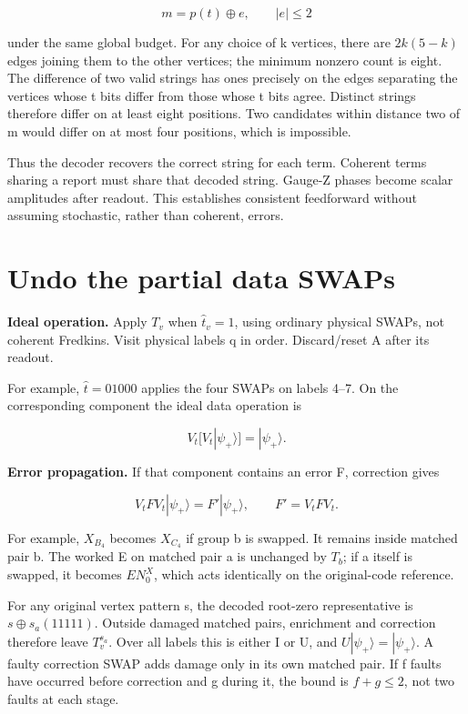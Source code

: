 \documentclass[11pt]{article}
\begin{document}
\[
m=p(t)\oplus e,\qquad |e|\le2
\]

under the same global budget. For any choice of k vertices, there are \(2k(5-k)\) edges joining them to the other vertices; the minimum nonzero count is eight. The difference of two valid strings has ones precisely on the edges separating the vertices whose t bits differ from those whose t bits agree. Distinct strings therefore differ on at least eight positions. Two candidates within distance two of m would differ on at most four positions, which is impossible.

Thus the decoder recovers the correct string for each term. Coherent terms sharing a report must share that decoded string. Gauge-Z phases become scalar amplitudes after readout. This establishes consistent feedforward without assuming stochastic, rather than coherent, errors.

\section{Undo the partial data SWAPs}
\textbf{Ideal operation.} Apply \(T_v\) when \(\widehat t_v=1\), using ordinary physical SWAPs, not coherent Fredkins. Visit physical labels q in order. Discard/reset A after its readout.

\begin{center}\begin{minipage}{\linewidth}

\end{minipage}\end{center}

For example, \(\widehat t=01000\) applies the four SWAPs on labels 4--7. On the corresponding component the ideal data operation is

\[
V_t\bigl[V_t|\psi_+\rangle\bigr]=|\psi_+\rangle.
\]

\textbf{Error propagation.} If that component contains an error F, correction gives

\[
V_t F V_t|\psi_+\rangle=F'|\psi_+\rangle,\qquad F'=V_t F V_t.
\]

For example, \(X_{B_4}\) becomes \(X_{C_4}\) if group b is swapped. It remains inside matched pair b. The worked E on matched pair a is unchanged by \(T_b\); if a itself is swapped, it becomes \(E N_0^X\), which acts identically on the original-code reference.

For any original vertex pattern s, the decoded root-zero representative is \(s\oplus s_a(11111)\). Outside damaged matched pairs, enrichment and correction therefore leave \(T_v^{s_a}\). Over all labels this is either I or U, and \(U|\psi_+\rangle=|\psi_+\rangle\). A faulty correction SWAP adds damage only in its own matched pair. If f faults have occurred before correction and g during it, the bound is \(f+g\le2\), not two faults at each stage.
\end{document}
